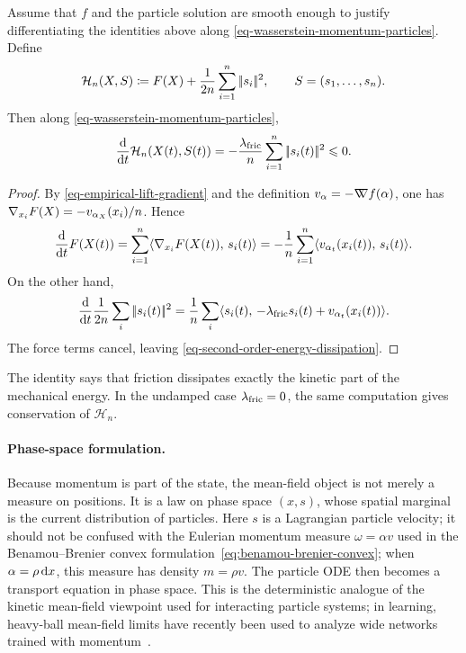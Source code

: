 \begin{prop}\label{prop-second-order-energy-dissipation}
	Assume that $f$ and the particle solution are smooth enough to justify differentiating the identities above along \eqref{eq-wasserstein-momentum-particles}. Define
	\[
		\mathcal H_n(X,S)
		\coloneqq
		F(X)+\frac1{2n}\sum_{i=1}^n|\!| s_i |\!|^2,
		\qquad
		S=(s_1,\ldots,s_n).
	\]
	Then along \eqref{eq-wasserstein-momentum-particles},
	\begin{equation}\label{eq-second-order-energy-dissipation}
		\frac{\mathrm{d}}{\mathrm{d} t}\mathcal H_n(X(t),S(t))
		=
		-\frac{\lambda_{\rm fric}}{n}\sum_{i=1}^n|\!| s_i(t) |\!|^2
		\leqslant 0.
	\end{equation}
\end{prop}
\begin{proof}
	By \eqref{eq-empirical-lift-gradient} and the definition $v_\alpha=-\mathord{\nabla\mkern-9.3mu\nabla} f(\alpha)$, one has $\nabla_{x_i}F(X)=-v_{\alpha_X}(x_i)/n$. Hence
	\[
		\frac{\mathrm{d}}{\mathrm{d} t}F(X(t))
		=
		\sum_{i=1}^n \langle \nabla_{x_i}F(X(t)),\,s_i(t)\rangle
		=
		-\frac1n\sum_{i=1}^n\langle v_{\alpha_t}(x_i(t)),\,s_i(t)\rangle.
	\]
	On the other hand,
	\[
		\frac{\mathrm{d}}{\mathrm{d} t}\frac1{2n}\sum_i|\!| s_i(t) |\!|^2
		=
		\frac1n\sum_i\langle s_i(t),\,-\lambda_{\rm fric} s_i(t)+v_{\alpha_t}(x_i(t))\rangle.
	\]
	The force terms cancel, leaving \eqref{eq-second-order-energy-dissipation}.
\end{proof}
The identity says that friction dissipates exactly the kinetic part of the mechanical energy. In the undamped case $\lambda_{\rm fric}=0$, the same computation gives conservation of $\mathcal H_n$.

\paragraph{Phase-space formulation.}
Because momentum is part of the state, the mean-field object is not merely a measure on positions. It is a law on phase space $(x,s)$, whose spatial marginal is the current distribution of particles. Here $s$ is a Lagrangian particle velocity; it should not be confused with the Eulerian momentum measure $\omega=\alpha v$ used in the Benamou--Brenier convex formulation~\eqref{eq:benamou-brenier-convex}; when $\alpha=\rho\,\mathrm{d} x$, this measure has density $m=\rho v$. The particle ODE then becomes a transport equation in phase space. This is the deterministic analogue of the kinetic mean-field viewpoint used for interacting particle systems; in learning, heavy-ball mean-field limits have recently been used to analyze wide networks trained with momentum~\cite{WuKungurtsevMondelli2022HeavyBallMeanField}.

